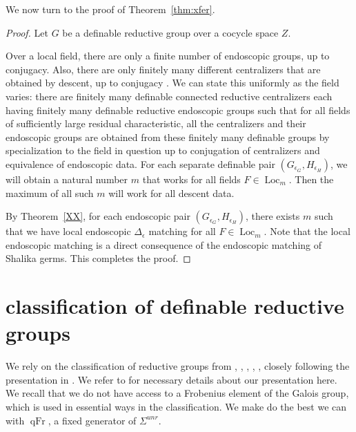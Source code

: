 \documentclass[12pt]{amsart}
\newcommand{\op}[1]{\operatorname{#1}}
\theoremstyle{plain}
\theoremstyle{definition}
\begin{document}
We now turn to the proof of Theorem~\ref{thm:xfer}.

\begin{proof} Let $G$ be a definable reductive group over a cocycle
  space $Z$.

  Over a local field, there are only a finite number of endoscopic
  groups, up to conjugacy.  Also, there are only finitely many
  different centralizers that are obtained by descent, up to conjugacy
  \cite[Sec.2.2]{LSd}.  We can state this uniformly as the field
  varies: there are finitely many definable connected reductive
  centralizers each having finitely many definable reductive
  endoscopic groups such that for all fields of sufficiently large
  residual characteristic, all the centralizers and their endoscopic
  groups are obtained from these finitely many definable groups by
  specialization to the field in question up to conjugation of
  centralizers and equivalence of endoscopic data.  For each separate
  definable pair $(G_{\epsilon_G},H_{\epsilon_H})$, we will obtain a
  natural number $m$ that works for all fields $F\in \op{Loc}_m$.
  Then the maximum of all such $m$ will work for all descent data.

  By Theorem~\ref{XX}, for each endoscopic pair
  $(G_{\epsilon_G},H_{\epsilon_H})$, there exists $m$ such that we
  have local endoscopic $\Delta_\epsilon$ matching for all
  $F\in\op{Loc}_m$.  Note that the local endoscopic matching is
  a direct consequence of the endoscopic matching of Shalika germs.  This
  completes the proof.
\end{proof}


\section{classification of definable reductive groups}\label{sec:classification}

We rely on the classification of reductive groups from \cite{Gille},
\cite{Tits}, \cite{Sel}, \cite{Petrov}, \cite{reeder2010torsion}, closely following the
presentation in \cite{Gross}.  We refer to \cite{Gross} for necessary
details about our presentation here.  We recall that we do not have
access to a Frobenius element of the Galois group, which is used in
essential ways in the classification.  We make do the best we can with
$\op{qFr}$, a fixed generator of $\Sigma^{unr}$.
\end{document}
